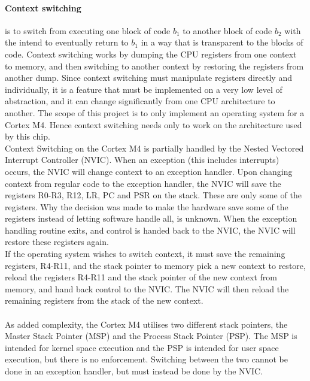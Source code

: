 \paragraph{Context switching} is to switch from executing one block of code $b_1$ to another block of code $b_2$
with the intend to eventually return to $b_1$ in a way that is transparent to the blocks of code. 
Context switching works by dumping the CPU registers from one context to memory,
and then switching to another context by restoring the registers from another dump.
Since context switching must manipulate registers directly and individually, it is a feature that must be implemented
on a very low level of abstraction, and it can change significantly from one CPU architecture to another.
The scope of this project is to only implement an operating system for a Cortex M4. Hence context switching needs only
to work on the architecture used by this chip.\\
Context Switching on the Cortex M4 is partially handled by the Nested Vectored Interrupt Controller (NVIC).
When an exception (this includes interrupts) occurs, the NVIC will change context to an exception handler.
Upon changing context from regular code to the exception handler, the NVIC will save the registers R0-R3, R12, LR, PC and PSR
on the stack. These are only some of the registers. Why the decision was made to make the hardware save some of the 
registers instead of letting software handle all, is unknown. 
When the exception handling routine exits, and control is handed back to the NVIC,
the NVIC will restore these registers again.\\
If the operating system wishes to switch context, it must save the remaining registers, R4-R11, and the stack pointer to memory 
pick a new context to restore, reload the registers R4-R11 and the stack pointer of the new context from memory,
and hand back control to the NVIC. The NVIC will then reload the remaining registers from the stack of the new context.\\\\
As added complexity, the Cortex M4 utilises two different stack pointers, the Master Stack Pointer (MSP) and the Process Stack Pointer (PSP).
The MSP is intended for kernel space execution and the PSP is intended for user space execution, but there is no enforcement.
Switching between the two cannot be done in an exception handler, but must instead be done by the NVIC.
